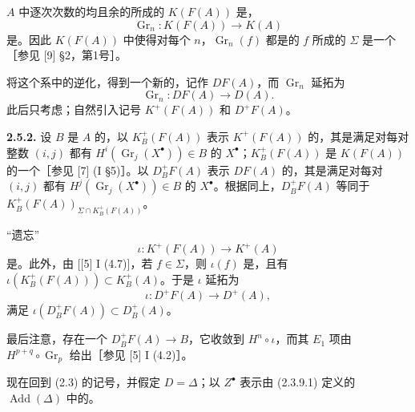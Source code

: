 $A$ 中逐次次数的均且余的所成的 $K(F(A))$ 是，
\[
\operatorname{Gr}_n:K(F(A))\longrightarrow K(A) \tag{2.5.1.1}
\]
是。因此 $K(F(A))$ 中使得对每个 $n$，$\operatorname{Gr}_n(f)$ 都是的 $f$ 所成的 $\Sigma$ 是一个［参见 [9] §2，第1号］。

将这个系中的逆化，得到一个新的，记作 $DF(A)$，而 $\operatorname{Gr}_n$ 延拓为
\[
\operatorname{Gr}_n:DF(A)\longrightarrow D(A). \tag{2.5.1.2}
\]
此后只考虑；自然引入记号 $K^+(F(A))$ 和 $D^+F(A)$。

\textbf{2.5.2.} 设 $B$ 是 $A$ 的，以 $K^+_B(F(A))$ 表示 $K^+(F(A))$ 的，其是满足对每对整数 $(i,j)$ 都有 $H^i(\operatorname{Gr}_j(X^\bullet))\in B$ 的 $X^\bullet$；$K^+_B(F(A))$ 是 $K(F(A))$ 的一个［参见 [7] (I §5)］。以 $D^+_BF(A)$ 表示 $DF(A)$ 的，其是满足对每对 $(i,j)$ 都有 $H^j(\operatorname{Gr}_j(X^\bullet))\in B$ 的 $X^\bullet$。根据同上，$D^+_BF(A)$ 等同于 $K^+_B(F(A))_{\Sigma\cap K^+_B(F(A))}$。

“遗忘”
\[
\iota:K^+(F(A))\longrightarrow K^+(A)
\]
是。此外，由 [[5] I (4.7)]，若 $f\in\Sigma$，则 $\iota(f)$ 是，且有 $\iota(K^+_B(F(A)))\subset K^+_B(A)$。于是 $\iota$ 延拓为
\[
\iota:D^+F(A)\longrightarrow D^+(A), \tag{2.5.2.1}
\]
满足 $\iota(D^+_BF(A))\subset D^+_B(A)$。

最后注意，存在一个 $D^+_BF(A)\to B$，它收敛到 $H^n\circ\iota$，而其 $E_1$ 项由 $H^{p+q}\circ\operatorname{Gr}_p$ 给出［参见 [5] I (4.2)］。

现在回到 (2.3) 的记号，并假定 $D=\Delta$；以 $Z^\bullet$ 表示由 (2.3.9.1) 定义的 $\operatorname{Add}(\Delta)$ 中的。


